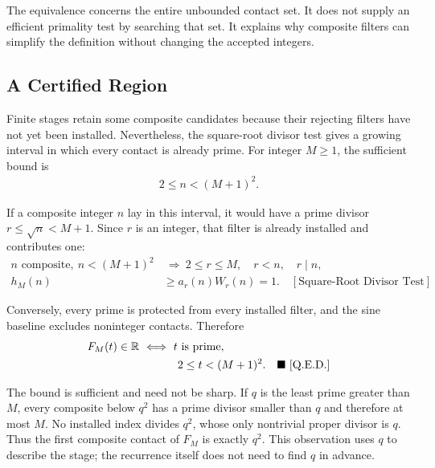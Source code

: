 The equivalence concerns the entire unbounded contact set. It does not supply
an efficient primality test by searching that set. It explains why composite
filters can simplify the definition without changing the accepted integers.


\subsection{A Certified Region}

Finite stages retain some composite candidates because their rejecting
filters have not yet been installed. Nevertheless, the square-root divisor
test \cite{dlmfsieve} gives a growing interval in which every contact is already
prime. For integer $M\ge1$, the sufficient bound is
\begin{equation*}
\begin{aligned}
2\le n < (M+1)^2.
\end{aligned}
\end{equation*}

If a composite integer $n$ lay in this interval, it would have a prime
divisor $r\le\sqrt n < M+1$. Since $r$ is an integer, that filter is already
installed and contributes one:
\begin{equation*}
\begin{aligned}
n\text{ composite},\ n < (M+1)^2
&\ \Longrightarrow\ 2\le r\le M,\quad r < n,\quad r\mid n,\\
h_M(n)&\ge a_r(n)W_r(n)=1.
\quad[\text{Square-Root Divisor Test}]
\end{aligned}
\end{equation*}

Conversely, every prime is protected from every installed filter, and the
sine baseline excludes noninteger contacts. Therefore
\begin{equation*}
\begin{aligned}
F_M(t)\in\mathbb R
&\ \Longleftrightarrow\ t\text{ is prime},\\
&\hspace{12mm}2\le t < (M+1)^2.
\quad\blacksquare\ \text{[Q.E.D.]}
\end{aligned}
\end{equation*}

The bound is sufficient and need not be sharp. If $q$ is the least prime greater
than $M$, every composite below $q^2$ has a prime divisor smaller than $q$
and therefore at most $M$. No installed index divides $q^2$, whose only
nontrivial proper divisor is $q$. Thus the first composite contact of $F_M$
is exactly $q^2$. This observation uses $q$ to describe the stage; the
recurrence itself does not need to find $q$ in advance.
